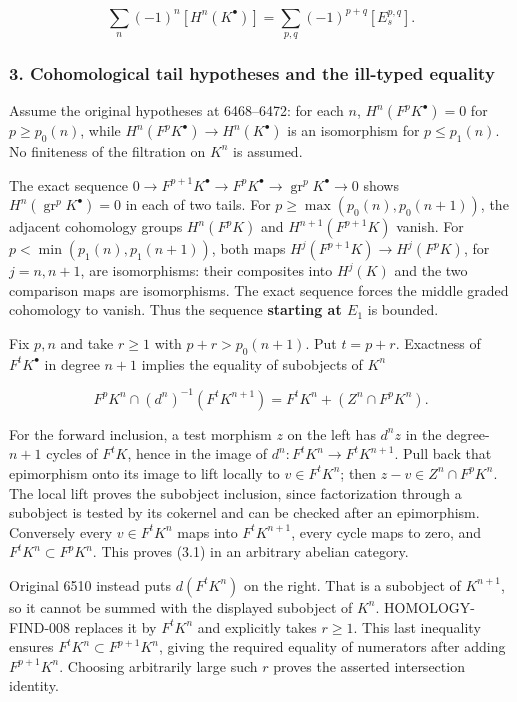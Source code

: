 \documentclass[11pt]{article}
\begin{document}
\[
\sum_n(-1)^n[H^n(K^\bullet)]
=\sum_{p,q}(-1)^{p+q}[E_s^{p,q}].             \tag{2.3}
\]

\subsubsection{3. Cohomological tail hypotheses and the ill-typed equality}\label{cohomological-tail-hypotheses-and-the-ill-typed-equality}

Assume the original hypotheses at 6468--6472: for each \(n\), \(H^n(F^pK^\bullet)=0\) for \(p\geq p_0(n)\), while \(H^n(F^pK^\bullet)\to H^n(K^\bullet)\) is an isomorphism for \(p\leq p_1(n)\). No finiteness of the filtration on \(K^n\) is assumed.

The exact sequence \(0\to F^{p+1}K^\bullet\to F^pK^\bullet\to\operatorname{gr}^pK^\bullet\to0\) shows \(H^n(\operatorname{gr}^pK^\bullet)=0\) in each of two tails. For \(p\geq\max(p_0(n),p_0(n+1))\), the adjacent cohomology groups \(H^n(F^pK)\) and \(H^{n+1}(F^{p+1}K)\) vanish. For \(p<\min(p_1(n),p_1(n+1))\), both maps \(H^j(F^{p+1}K)\to H^j(F^pK)\), for \(j=n,n+1\), are isomorphisms: their composites into \(H^j(K)\) and the two comparison maps are isomorphisms. The exact sequence forces the middle graded cohomology to vanish. Thus the sequence \textbf{starting at \(E_1\)} is bounded.

Fix \(p,n\) and take \(r\geq1\) with \(p+r>p_0(n+1)\). Put \(t=p+r\). Exactness of \(F^tK^\bullet\) in degree \(n+1\) implies the equality of subobjects of \(K^n\)

\[
F^pK^n\cap(d^n)^{-1}(F^tK^{n+1})
=F^tK^n+(Z^n\cap F^pK^n).                  \tag{3.1}
\]

For the forward inclusion, a test morphism \(z\) on the left has \(d^nz\) in the degree-\(n+1\) cycles of \(F^tK\), hence in the image of \(d^n:F^tK^n\to F^tK^{n+1}\). Pull back that epimorphism onto its image to lift locally to \(v\in F^tK^n\); then \(z-v\in Z^n\cap F^pK^n\). The local lift proves the subobject inclusion, since factorization through a subobject is tested by its cokernel and can be checked after an epimorphism. Conversely every \(v\in F^tK^n\) maps into \(F^tK^{n+1}\), every cycle maps to zero, and \(F^tK^n\subset F^pK^n\). This proves (3.1) in an arbitrary abelian category.

Original 6510 instead puts \(d(F^tK^n)\) on the right. That is a subobject of \(K^{n+1}\), so it cannot be summed with the displayed subobject of \(K^n\). HOMOLOGY-FIND-008 replaces it by \(F^tK^n\) and explicitly takes \(r\geq1\). This last inequality ensures \(F^tK^n\subset F^{p+1}K^n\), giving the required equality of numerators after adding \(F^{p+1}K^n\). Choosing arbitrarily large such \(r\) proves the asserted intersection identity.
\end{document}
